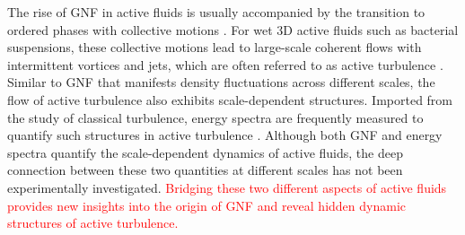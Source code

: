 \documentclass[twocolumn,aps,prl,amsmath,amssymb,longbibliography]{revtex4-2}
\begin{document}



The rise of GNF in active fluids is usually accompanied by the transition to ordered phases with collective motions \cite{Ramaswamy2010,Marchetti2013}. For wet 3D active fluids such as bacterial suspensions, these collective motions lead to large-scale coherent flows with intermittent vortices and jets, which are often referred to as active turbulence \cite{Wolgemuth2008,Wensink2012,Dunkel2013a,Bratanov2015,Guo2018,Linkmann2019,Bardfalvy2019,Alert2020,Skultety2020,Peng2020}. Similar to GNF that manifests density fluctuations across different scales, the flow of active turbulence also exhibits scale-dependent structures. Imported from the study of classical turbulence, energy spectra are frequently measured to quantify such structures in active turbulence \cite{Ishikawa2011,Wensink2012,Dunkel2013a,Giomi2015,Creppy2015,Patteson2018,Alert2020}. Although both GNF and energy spectra quantify the scale-dependent dynamics of active fluids, the deep connection between these two quantities at different scales has not been experimentally investigated. \textcolor{red}{Bridging these two different aspects of active fluids provides new insights into the origin of GNF and reveal hidden dynamic structures of active turbulence.}

\end{document}
